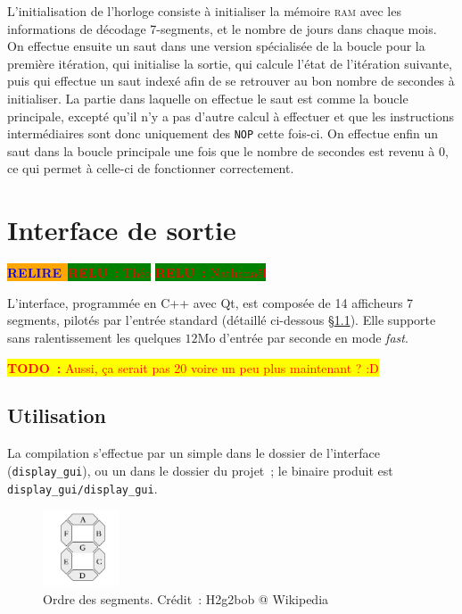 \documentclass[11pt,a4paper]{article}
\newcommand{\todo}[1]{\colorbox{yellow}{\textcolor{red}{\textbf{TODO~:} #1}}}
\newcommand{\relire}{\colorbox{orange}{\textcolor{blue}{\textbf{RELIRE}~}}}
\newcommand{\relu}[1]{\colorbox{green}{\textcolor{red}{\textbf{RELU~:} #1}}}
\begin{document}
L'initialisation de l'horloge consiste à initialiser la mémoire
\textsc{ram} avec les informations de décodage 7-segments, et le
nombre de jours dans chaque mois. On effectue ensuite un saut dans une
version spécialisée de la boucle pour la première itération, qui
initialise la sortie, qui calcule l'état de l'itération suivante, puis
qui effectue un saut indexé afin de se retrouver au bon nombre de
secondes à initialiser. La partie dans laquelle on effectue le saut
est comme la boucle principale, excepté qu'il n'y a pas d'autre calcul
à effectuer et que les instructions intermédiaires sont donc
uniquement des \verb!NOP! cette fois-ci. On effectue enfin un saut
dans la boucle principale une fois que le nombre de secondes est
revenu à 0, ce qui permet à celle-ci de fonctionner correctement.


\section{Interface de sortie} \label{sec:gui}

\relire \relu{Théo}
\relu{Nathanaël}

L'interface, programmée en C++ avec Qt, est composée de 14 afficheurs 7 segments, pilotés par l'entrée standard (détaillé ci-dessous §\ref{ssec:gui_use}). Elle supporte sans ralentissement les quelques $12\text{Mo}$ d'entrée par seconde en mode \emph{fast}.

\todo{Aussi, ça serait pas 20 voire un peu plus maintenant ? :D}

\subsection{Utilisation} \label{ssec:gui_use}

La compilation s'effectue par un simple  dans le dossier de l'interface (\texttt{display\_gui}), ou un  dans le dossier du projet~; le binaire produit est \texttt{display\_gui/display\_gui}.

\begin{figure}
\begin{center}
\vspace{-1em}
\includegraphics[width=0.2\textwidth]{imgs/7seg-labels.png}
\end{center}
\vspace{-2em}
\caption{Ordre des segments. Crédit~: H2g2bob @ Wikipedia}
\label{fig:segorder}
\end{figure}
\end{document}
